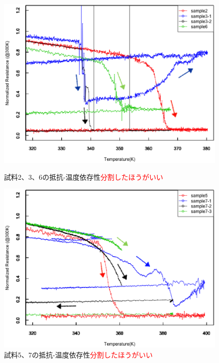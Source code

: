 \begin{figure}[!h]
 \begin{minipage}{\hsize}
    \begin{center}
   \includegraphics[width=0.9\hsize]{samples/Trans.eps}
  \end{center}
  \caption{試料2、3、6の抵抗-温度依存性\textcolor{red}{分割したほうがいい}}
  \label{fig:Trans}
 \end{minipage}
 \begin{minipage}{\hsize}
     \begin{center}
   \includegraphics[width=0.9\hsize]{samples/Trans2.eps}
  \end{center}
  \caption{試料5、7の抵抗-温度依存性\textcolor{red}{分割したほうがいい}}
  \label{fig:Trans2}
   \end{minipage}
\end{figure}

